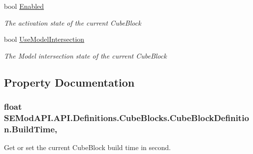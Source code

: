 \begin{DoxyCompactItemize}
\item 
bool \hyperlink{class_s_e_mod_a_p_i_1_1_a_p_i_1_1_definitions_1_1_cube_blocks_1_1_cube_block_definition_af36249ff4499e387e48dbaa1e83e4749}{Enabled}
\begin{DoxyCompactList}\small\item\em The activation state of the current Cube\+Block \end{DoxyCompactList}\item 
bool \hyperlink{class_s_e_mod_a_p_i_1_1_a_p_i_1_1_definitions_1_1_cube_blocks_1_1_cube_block_definition_a2f13555e088bbfd5392ce6677f31e47e}{Use\+Model\+Intersection}
\begin{DoxyCompactList}\small\item\em The Model intersection state of the current Cube\+Block \end{DoxyCompactList}\end{DoxyCompactItemize}


\subsection{Property Documentation}
\hypertarget{class_s_e_mod_a_p_i_1_1_a_p_i_1_1_definitions_1_1_cube_blocks_1_1_cube_block_definition_a5c5b656ffe7af1c69101204a3fc672d6}{}
\subsubsection[{Build\+Time}]{\setlength{\rightskip}{0pt plus 5cm}float S\+E\+Mod\+A\+P\+I.\+A\+P\+I.\+Definitions.\+Cube\+Blocks.\+Cube\+Block\+Definition.\+Build\+Time\hspace{0.3cm}{\ttfamily [get]}, {\ttfamily [set]}}\label{class_s_e_mod_a_p_i_1_1_a_p_i_1_1_definitions_1_1_cube_blocks_1_1_cube_block_definition_a5c5b656ffe7af1c69101204a3fc672d6}


Get or set the current Cube\+Block build time in second. 

